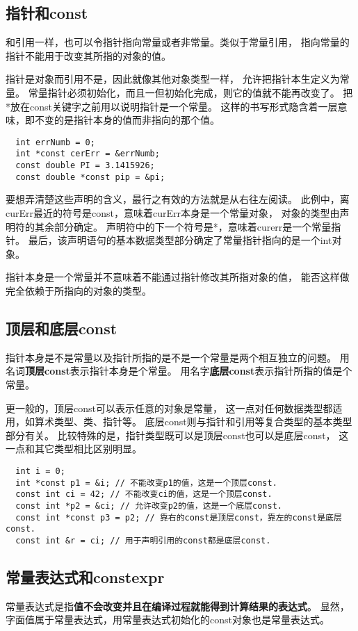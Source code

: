 \subsection{指针和const}
和引用一样，也可以令指针指向常量或者非常量。类似于常量引用，%
指向常量的指针不能用于改变其所指的对象的值。%
\par
指针是对象而引用不是，因此就像其他对象类型一样，%
允许把指针本生定义为常量。%
常量指针必须初始化，而且一但初始化完成，则它的值就不能再改变了。%
把*放在const关键字之前用以说明指针是一个常量。%
这样的书写形式隐含着一层意味，即不变的是指针本身的值而非指向的那个值。%
\begin{lstlisting}
  int errNumb = 0;
  int *const cerErr = &errNumb;
  const double PI = 3.1415926;
  const double *const pip = &pi;
\end{lstlisting}
要想弄清楚这些声明的含义，最行之有效的方法就是从右往左阅读。%
此例中，离curErr最近的符号是const，意味着curErr本身是一个常量对象，%
对象的类型由声明符的其余部分确定。%
声明符中的下一个符号是*，意味着curerr是一个常量指针。%
最后，该声明语句的基本数据类型部分确定了常量指针指向的是一个int对象。%
\par
指针本身是一个常量并不意味着不能通过指针修改其所指对象的值，%
能否这样做完全依赖于所指向的对象的类型。%
\subsection{顶层和底层const}
指针本身是不是常量以及指针所指的是不是一个常量是两个相互独立的问题。%
用名词{\bfseries{顶层const}}表示指针本身是个常量。%
用名字{\bfseries{底层const}}表示指针所指的值是个常量。
\par
更一般的，顶层const可以表示任意的对象是常量，%
这一点对任何数据类型都适用，如算术类型、类、指针等。%
底层const则与指针和引用等复合类型的基本类型部分有关。%
比较特殊的是，指针类型既可以是顶层const也可以是底层const，%
这一点和其它类型相比区别明显。
\begin{lstlisting}
  int i = 0; 
  int *const p1 = &i; // 不能改变p1的值，这是一个顶层const.
  const int ci = 42; // 不能改变ci的值，这是一个顶层const.
  const int *p2 = &ci; // 允许改变p2的值，这是一个底层const.
  const int *const p3 = p2; // 靠右的const是顶层const，靠左的const是底层const.
  const int &r = ci; // 用于声明引用的const都是底层const.
\end{lstlisting}
\subsection{常量表达式和constexpr}
常量表达式是指{\bfseries{值不会改变并且在编译过程就能得到计算结果的表达式}}。%
显然，字面值属于常量表达式，用常量表达式初始化的const对象也是常量表达式。%
